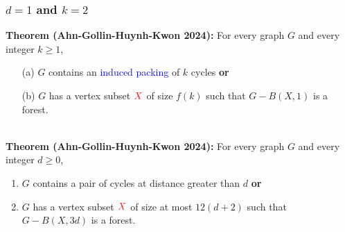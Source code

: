 \documentclass{beamer}
\begin{document}
\begin{frame}
\begin{center}
    \end{center}
\end{frame}

\begin{frame}
  \frametitle{$d=1$ and $k=2$}


  \noindent\textbf{Theorem (Ahn-Gollin-Huynh-Kwon 2024):} For every graph $G$ and every integer $k\ge 1$,
  \begin{enumerate}%
    \item[(a)] $G$ contains an \textcolor{blue}{induced packing} of $k$ cycles \textbf{or}
    \item[(b)] $G$ has a vertex subset $\mathcolor{red}{X}$ of size $f(k)$ such that $G-B(X,1)$ is a forest.
  \end{enumerate}
  \ \\[2ex]
  \noindent\textbf{Theorem (Ahn-Gollin-Huynh-Kwon 2024):} For every graph $G$ and every integer $d\ge 0$,
  \begin{enumerate}%
    \item $G$ contains a pair of cycles at distance greater than $d$ \textbf{or}
    \item $G$ has a vertex subset $\mathcolor{red}{X}$ of size at most $12(d+2)$ such that $G-B(X,3d)$ is a forest.
  \end{enumerate}
\end{frame}
\end{document}

